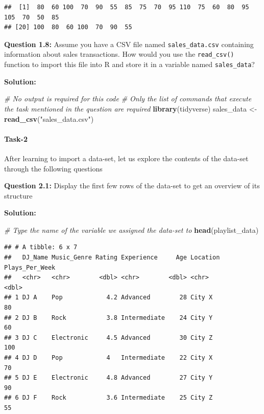 \documentclass[
]{article}
\newenvironment{Shaded}{\begin{snugshade}}{\end{snugshade}}
\newcommand{\CommentTok}[1]{\textcolor[rgb]{0.56,0.35,0.01}{\textit{#1}}}
\newcommand{\FunctionTok}[1]{\textcolor[rgb]{0.13,0.29,0.53}{\textbf{#1}}}
\newcommand{\NormalTok}[1]{#1}
\newcommand{\OtherTok}[1]{\textcolor[rgb]{0.56,0.35,0.01}{#1}}
\newcommand{\StringTok}[1]{\textcolor[rgb]{0.31,0.60,0.02}{#1}}
\begin{document}
\begin{verbatim}
##  [1]  80  60 100  70  90  55  85  75  70  95 110  75  60  80  95 105  70  50  85
## [20] 100  80  60 100  70  90  55
\end{verbatim}

\textbf{Question 1.8:} Assume you have a CSV file named
\texttt{sales\_data.csv} containing information about sales
transactions. How would you use the \texttt{read\_csv()} function to
import this file into R and store it in a variable named
\texttt{sales\_data}?

\textbf{Solution:}

\begin{Shaded}
\begin{Highlighting}[]
\CommentTok{\# No output is required for this code}
\CommentTok{\# Only the list of commands that execute the task mentioned in the question are required}
\FunctionTok{library}\NormalTok{(tidyverse)}
\NormalTok{sales\_data }\OtherTok{\textless{}{-}} \FunctionTok{read\_csv}\NormalTok{(}\StringTok{"sales\_data.csv"}\NormalTok{)}
\end{Highlighting}
\end{Shaded}

\hypertarget{task-2}{%
\paragraph{Task-2}\label{task-2}}

After learning to import a data-set, let us explore the contents of the
data-set through the following questions

\textbf{Question 2.1:} Display the first few rows of the data-set to get
an overview of its structure

\textbf{Solution:}

\begin{Shaded}
\begin{Highlighting}[]
\CommentTok{\# Type the name of the variable we assigned the data{-}set to}
\FunctionTok{head}\NormalTok{(playlist\_data)}
\end{Highlighting}
\end{Shaded}

\begin{verbatim}
## # A tibble: 6 x 7
##   DJ_Name Music_Genre Rating Experience     Age Location Plays_Per_Week
##   <chr>   <chr>        <dbl> <chr>        <dbl> <chr>             <dbl>
## 1 DJ A    Pop            4.2 Advanced        28 City X               80
## 2 DJ B    Rock           3.8 Intermediate    24 City Y               60
## 3 DJ C    Electronic     4.5 Advanced        30 City Z              100
## 4 DJ D    Pop            4   Intermediate    22 City X               70
## 5 DJ E    Electronic     4.8 Advanced        27 City Y               90
## 6 DJ F    Rock           3.6 Intermediate    25 City Z               55
\end{verbatim}
\end{document}
